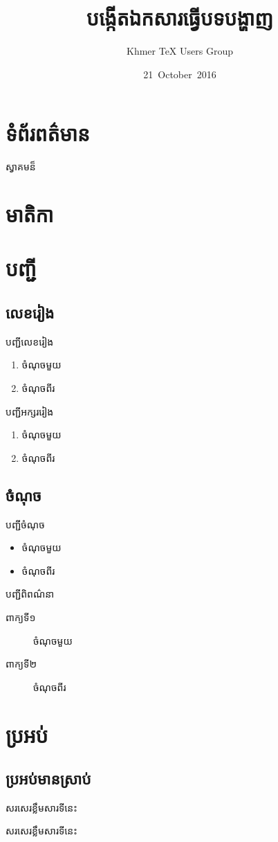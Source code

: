 \documentclass{beamer}
\author[KHTUG]{Khmer \TeX{} Users Group}
\title[beamer]{បង្កើតឯកសារធ្វើបទបង្ហាញ}
\date[21/10/2016]{21~October~2016}
\begin{document}
%
\section{ទំព័រពត៌មាន}
\begin{frame}{ស្វាគមន៏}
	\titlepage
\end{frame}
%
\section{មាតិកា}
\begin{frame}{\insertsection}
	\tableofcontents
\end{frame}
%
\section{បញ្ជី}
\subsection{លេខរៀង}
\begin{frame}{\insertsubsection}
បញ្ជីលេខរៀង
\begin{enumerate}
	\item ចំណុចមួយ
	\item ចំណុចពីរ
\end{enumerate}
%
បញ្ជីអក្សររៀង
\begin{enumerate}[a]
	\item ចំណុចមួយ
	\item ចំណុចពីរ
\end{enumerate}
\end{frame}
\subsection{ចំណុច}
\begin{frame}{\insertsubsection}
បញ្ជីចំណុច
\begin{itemize}
	\item ចំណុចមួយ
	\item ចំណុចពីរ
\end{itemize}
%
បញ្ជីពិពណ៌នា
\begin{description}
	\item[ពាក្យទី១] ចំណុចមួយ
	\item[ពាក្យទី២] ចំណុចពីរ
\end{description}
\end{frame}
%
\section{ប្រអប់}
\subsection{ប្រអប់មានស្រាប់}
\begin{frame}{\insertsubsection}
	\begin{definition}[ឈ្មោះ]
		សរសេរខ្លឹមសារទីនេះ
	\end{definition}
%
	\begin{example}[ឈ្មោះ]
		សរសេរខ្លឹមសារទីនេះ
	\end{example}
\end{frame}
%
\end{document}

